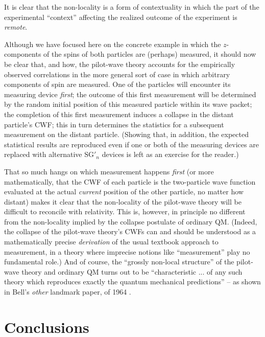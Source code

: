 \documentclass[aps,prc,onecolumn,letterpaper,floatfix,12pt]{revtex4}
\begin{document}
It is clear that the non-locality is a form of contextuality in which
the part of the experimental ``context'' affecting the realized
outcome of the experiment is \emph{remote}.


Although we have focused here on the concrete example in which the
$z$-components of the spins of both particles are (perhaps) measured,
it should now be clear that, and how, the pilot-wave theory accounts
for the empirically observed correlations in the more general sort of
case in which arbitrary components of spin are measured.  One of the
particles will encounter its measuring device \emph{first}; the
outcome of this first measurement will be determined by the random
initial position of this measured particle within its wave packet; the
completion of this first measurement induces a collapse in
the distant particle's CWF; this in turn determines the statistics for
a subsequent measurement on the distant particle.   (Showing that, in
addition, the expected statistical results are reproduced even if one
or both of the measuring devices are replaced with alternative
$\text{SG}'_n$ devices is left as an exercise for the reader.)  

That so much hangs on which measurement happens \emph{first} (or more
mathematically, that the CWF of each particle is the two-particle wave
function evaluated at the actual \emph{current} position of the other
particle, no matter how distant) makes it clear that the non-locality
of the pilot-wave theory will be difficult to reconcile with
relativity.  This is, however, in principle no different from the
non-locality implied by the collapse postulate of ordinary QM.
(Indeed, the collapse of the pilot-wave theory's CWFs can
and should be understood as a mathematically precise \emph{derivation}
of the usual textbook approach to measurement, in a theory where
imprecise notions like ``measurement'' play no fundamental role.)  And
of course, the ``grossly non-local structure'' of the pilot-wave
theory and ordinary QM turns out to be ``characteristic ... of any
such theory which reproduces exactly the quantum mechanical
predictions'' -- as shown in Bell's \emph{other} landmark paper, of
1964 \cite{bell64}.  


\section{Conclusions}
\label{sec7}

\end{document}
